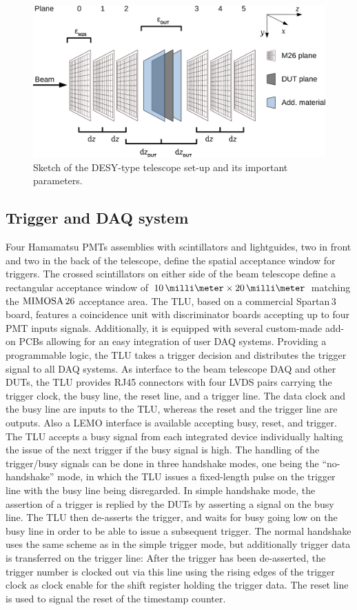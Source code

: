 \begin{figure}[tb]
	\center
	\includegraphics[width=.9\textwidth]{figures/sketch_tscope4}
	\caption[Sketch of the DESY-type telescope set-up]{Sketch of the DESY-type telescope set-up and its important parameters.}
	\label{fig:datura_sketch}
\end{figure}

\subsection{Trigger and DAQ system}

Four Hamamatsu PMTs assemblies with scintillators and lightguides, two in front and two in the back of the telescope, define the spatial acceptance window for triggers. 
The crossed scintillators on either side of the beam telescope define a rectangular acceptance window of $10\,\milli\meter \times 20\,\milli\meter$ matching the $\textrm{MIMOSA\,26}$ acceptance area. 
The TLU, based on a commercial Spartan\,3 board, features a coincidence unit with discriminator boards accepting up to four PMT inputs signals. 
Additionally, it is equipped with several custom-made add-on PCBs allowing for an easy integration of user DAQ systems. 
Providing a programmable logic, the TLU  takes a trigger decision and distributes the trigger signal to all DAQ systems.
As interface to the beam telescope DAQ and other DUTs, the TLU provides RJ45 connectors with four LVDS pairs carrying the trigger clock, the busy line, the reset line, and a trigger line. 
The data clock and the busy line are inputs to the TLU, whereas the reset and the trigger line are outputs. 
Also a LEMO interface is available accepting busy, reset, and trigger. 
The TLU accepts a busy signal from each integrated device individually halting the issue of the next trigger if the busy signal is high. 
The handling of the trigger/busy signals can be done in three handshake modes, one being the ``no-handshake'' mode,
 in which the TLU issues a fixed-length pulse on the trigger line with the busy line being disregarded. 
In simple handshake mode, the assertion of a trigger is replied by the DUTs by asserting a signal on the busy line. 
The TLU then de-asserts the trigger, and waits for busy going low on the busy line in order to be able to issue a subsequent trigger.
The normal handshake uses the same scheme as in the simple trigger mode, but additionally trigger data is transferred on the trigger line:
After the trigger has been de-asserted, the trigger number is clocked out via this line using the rising edges of the trigger clock as clock enable for the shift register holding the trigger data. 
The reset line is used to signal the reset of the timestamp counter.

